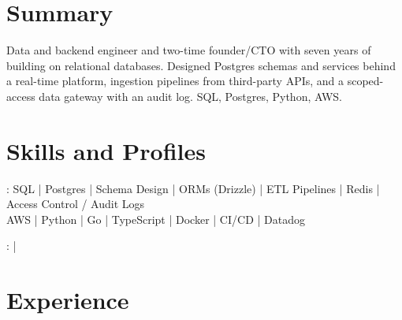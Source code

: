 \documentclass[print]{jack-resume}
\begin{document}
\pagecolor{darkmodeBackground}


\begin{minipage}[t][1cm][t]{.03\textwidth}
    \hfill
\end{minipage}

\section{Summary}
Data and backend engineer and two-time founder/CTO with seven years of building on relational databases. Designed Postgres schemas and services behind a real-time platform, ingestion pipelines from third-party APIs, and a scoped-access data gateway with an audit log. SQL, Postgres, Python, AWS.
\sectionsep

\section{Skills and Profiles}
:
SQL \hfill | \hfill
Postgres \hfill | \hfill
Schema Design \hfill | \hfill
ORMs (Drizzle) \hfill | \hfill
ETL Pipelines \hfill | \hfill
Redis \hfill | \hfill
Access Control / Audit Logs \\
\hspace{1.0cm} AWS \hfill | \hfill
Python \hfill | \hfill
Go \hfill | \hfill
TypeScript \hfill | \hfill
Docker \hfill | \hfill
CI/CD \hfill | \hfill
Datadog \\

\raggedright{
    :
      \href{https://www.linkedin.com/in/jack-sturtevant/}{ \ExternalLink} |
     \href{https://github.com/jacksturt}{ \ExternalLink}}

\section{Experience}
\end{document}
